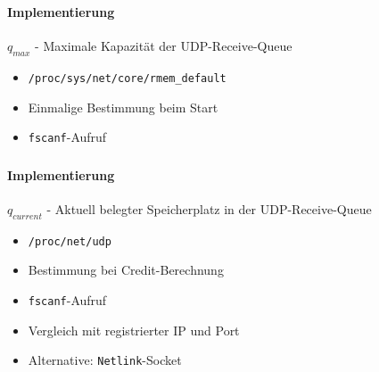 \documentclass{beamer}
\begin{document}

    \begin{frame}[containsverbatim]
        \frametitle{\mytitle}
        \framesubtitle{Implementierung}
        $q_{max}$ - Maximale Kapazität der UDP-Receive-Queue
        \vspace{10pt}\par
        \begin{itemize}
            \item \texttt{/proc/sys/net/core/rmem\_default}
            \item Einmalige Bestimmung beim Start
            \item \texttt{fscanf}-Aufruf
        \end{itemize}
        \vspace{20pt}\par
		
    \end{frame}

    \begin{frame}[containsverbatim]
        \frametitle{\mytitle}
        \framesubtitle{Implementierung}
        $q_{current}$ - Aktuell belegter Speicherplatz in der UDP-Receive-Queue
        \vspace{10pt}\par
        \begin{itemize}
            \item \texttt{/proc/net/udp}
            \item Bestimmung bei Credit-Berechnung
            \item \texttt{fscanf}-Aufruf
            \item Vergleich mit registrierter IP und Port
            \item Alternative: \texttt{Netlink}-Socket
        \end{itemize}
        \vspace{20pt}\par
		
    \end{frame}
\end{document}
